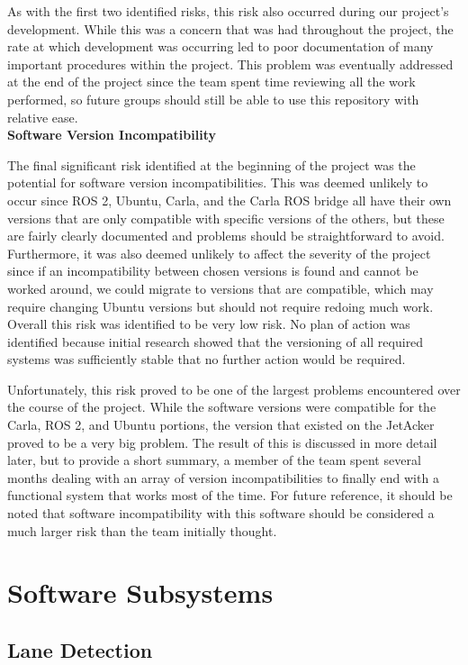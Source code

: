 \documentclass[titlepage, draft]{article}
\begin{document}
As with the first two identified risks, this risk also occurred during our project's development. While this was a concern that was had throughout the project, the rate at which development was occurring led to poor documentation of many important procedures within the project. This problem was eventually addressed at the end of the project since the team spent time reviewing all the work performed, so future groups should still be able to use this repository with relative ease.
\\

\textbf{Software Version Incompatibility}

The final significant risk identified at the beginning of the project was the potential for software version incompatibilities. This was deemed unlikely to occur since ROS 2, Ubuntu, Carla, and the Carla ROS bridge all have their own versions that are only compatible with specific versions of the others, but these are fairly clearly documented and problems should be straightforward to avoid. Furthermore, it was also deemed unlikely to affect the severity of the project since if an incompatibility between chosen versions is found and cannot be worked around, we could migrate to versions that are compatible, which may require changing Ubuntu versions but should not require redoing much work. Overall this risk was identified to be very low risk. No plan of action was identified because initial research showed that the versioning of all required systems was sufficiently stable that no further action would be required.

Unfortunately, this risk proved to be one of the largest problems encountered over the course of the project. While the software versions were compatible for the Carla, ROS 2, and Ubuntu portions, the version that existed on the JetAcker proved to be a very big problem. The result of this is discussed in more detail later, but to provide a short summary, a member of the team spent several months dealing with an array of version incompatibilities to finally end with a functional system that works most of the time. For future reference, it should be noted that software incompatibility with this software should be considered a much larger risk than the team initially thought.


\section{Software Subsystems}

\subsection{Lane Detection}
\end{document}
